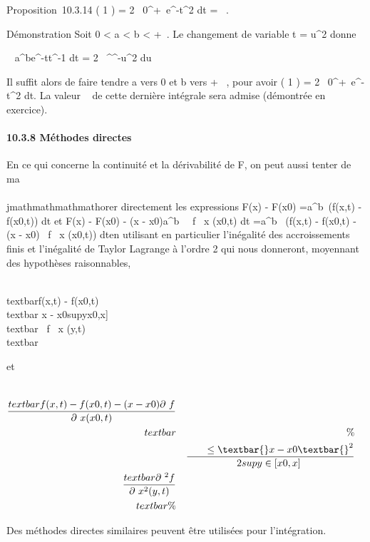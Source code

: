 Proposition~10.3.14 \Gamma( 1  ) =
2\int ~
0^+\infty~e^-t^2  dt =
\sqrt\pi~.

Démonstration Soit 0 \textless{} a \textless{} b \textless{} +\infty~. Le
changement de variable t = u^2 donne

\int ~
a^be^-tt^-1 dt =
2\int ~
\sqrta^\sqrtbe^-u^2
 du

Il suffit alors de faire tendre a vers 0 et b vers + \infty~, pour avoir \Gamma(
1  ) = 2\int ~
0^+\infty~e^-t^2  dt. La valeur 
\sqrt\pi~  de cette dernière
intégrale sera admise (démontrée en exercice).

\paragraph{10.3.8 Méthodes directes}

En ce qui concerne la continuité et la dérivabilité de F, on peut aussi
tenter de ma\\\\jmathmathmathmathorer directement les expressions F(x) - F(x0)
=\int  a^b~(f(x,t) -
f(x0,t)) dt et F(x) - F(x0) - (x -
x0)\int  a^b~ \partial~f
\over \partial~x (x0,t) dt
=\int  a^b~\left
(f(x,t) - f(x0,t) - (x - x0) \partial~f
\over \partial~x (x0,t)\right ) dten
utilisant en particulier l'inégalité des accroissements finis et
l'inégalité de Taylor Lagrange à l'ordre 2 qui nous donneront, moyennant
des hypothèses raisonnables,

\\textbar{}f(x,t) -
f(x0,t)\\textbar{} \leq\textbar{}x -
x0\textbar{}supy\in{[}x0,x{]}~\\textbar{}
\partial~f \over \partial~x (y,t)\\textbar{}

et

\begin{align*} \\textbar{}f(x,t) -
f(x0,t) - (x - x0) \partial~f \over \partial~x
(x0,t)\\textbar{}&& \%&
\\ & & \quad
\quad \leq \textbar{}x -
x0\textbar{}^2 \over 2
supy\in{[}x0,x{]}~\\textbar{}
\partial~^2f \over \partial~x^2
(y,t)\\textbar{}\%& \\
\end{align*}

Des méthodes directes similaires peuvent être utilisées pour
l'intégration.

